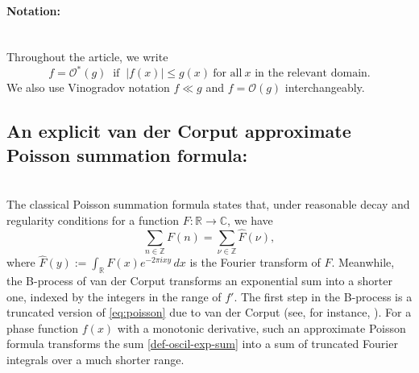 \documentclass[11pt,letterpaper,oneside,reqno]{amsart}
\renewcommand{\^}[1]{\widehat{#1}}
\renewcommand{\O}{{\mathcal{O}}}
\newcommand{\R}{{\mathbb{R}}}
\newcommand{\C}{{\mathbb{C}}}
\newcommand{\Z}{{\mathbb{Z}}}
\numberwithin{equation}{section}
\theoremstyle{remark}
\begin{document}
\paragraph{\bf Notation:} \ \\
Throughout the article, we write \[f=\mathcal{O}^*(g)\ \text{ if }\ |f(x)|\leq g(x)\ \text{for all} \ x \text{ in the relevant domain}.\]
We also use Vinogradov notation $f\ll g$ and $f=\O(g)$ interchangeably. %
\medskip 

\subsection{An explicit van der Corput approximate Poisson summation formula:} \ \\
The classical Poisson summation formula states that, under reasonable decay and regularity conditions for a function $F:\R\to\C$, we have 
\begin{equation}\label{eq:poisson}
    \sum_{n\in\Z} F(n) = \sum_{\nu\in\Z} \widehat F(\nu), 
\end{equation}
where $\widehat F(y):=\int_\R F(x)e^{-2\pi i x y}\, dx$ is the Fourier transform of $F$. 
Meanwhile, the B-process of van der Corput transforms an exponential sum into a shorter one, indexed by the integers in the range of $f'$. The first step in the B-process is a truncated version of \eqref{eq:poisson} due to van der Corput (see, for instance, \cite[Section 8.3]{Iwaniec-Kowalski}). 
For a phase function $f(x)$ with a monotonic derivative, such an approximate Poisson formula transforms the sum \eqref{def-oscil-exp-sum} into a sum of truncated Fourier integrals over a much shorter range. 
\smallskip 
\end{document}
